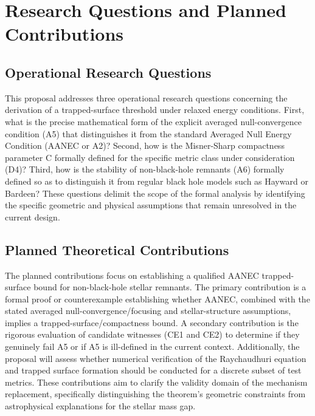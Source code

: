 \documentclass[conference]{IEEEtran}
\begin{document}
\section{Research Questions and Planned Contributions}
\subsection{Operational Research Questions}
This proposal addresses three operational research questions concerning the derivation of a trapped-surface threshold under relaxed energy conditions. First, what is the precise mathematical form of the explicit averaged null-convergence condition (A5) that distinguishes it from the standard Averaged Null Energy Condition (AANEC or A2)? Second, how is the Misner-Sharp compactness parameter C formally defined for the specific metric class under consideration (D4)? Third, how is the stability of non-black-hole remnants (A6) formally defined so as to distinguish it from regular black hole models such as Hayward or Bardeen? These questions delimit the scope of the formal analysis by identifying the specific geometric and physical assumptions that remain unresolved in the current design.

\subsection{Planned Theoretical Contributions}
The planned contributions focus on establishing a qualified AANEC trapped-surface bound for non-black-hole stellar remnants. The primary contribution is a formal proof or counterexample establishing whether AANEC, combined with the stated averaged null-convergence/focusing and stellar-structure assumptions, implies a trapped-surface/compactness bound. A secondary contribution is the rigorous evaluation of candidate witnesses (CE1 and CE2) to determine if they genuinely fail A5 or if A5 is ill-defined in the current context. Additionally, the proposal will assess whether numerical verification of the Raychaudhuri equation and trapped surface formation should be conducted for a discrete subset of test metrics. These contributions aim to clarify the validity domain of the mechanism replacement, specifically distinguishing the theorem's geometric constraints from astrophysical explanations for the stellar mass gap.
\end{document}
